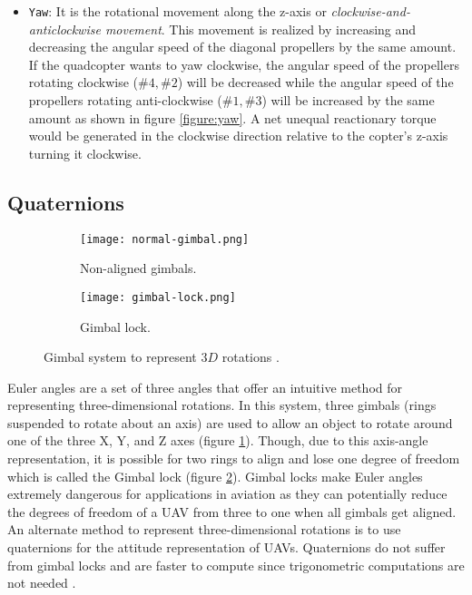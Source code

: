 \documentclass[10pt, a4paper]{article}
\newcommand{\code}[1]{\texttt{#1}}
\begin{document}
\begin{itemize}
        \item \code{Yaw}: It is the rotational movement along the z-axis or \textit{clockwise-and-anticlockwise movement}. This movement is realized by increasing and decreasing the angular speed of the diagonal propellers by the same amount. If the quadcopter wants to yaw clockwise, the angular speed of the propellers rotating clockwise ($\#4, \#2$) will be decreased while the angular speed of the propellers rotating anti-clockwise ($\#1, \#3$) will be increased by the same amount as shown in figure \ref{figure:yaw}. A net unequal reactionary torque would be generated in the clockwise direction relative to the copter's z-axis turning it clockwise.
    \end{itemize}

    \subsection{Quaternions}
    \label{section:quaternions}

    \begin{figure}[hbt!]
        \centering
        \begin{subfigure}[b]{0.35\textwidth}
            \centering
            \texttt{[image: normal-gimbal.png]}
            \caption{Non-aligned gimbals.}
            \label{figure:normal-gimbal}
        \end{subfigure}
        \begin{subfigure}[b]{0.35\textwidth}
            \centering
            \texttt{[image: gimbal-lock.png]}
            \caption{Gimbal lock.}
            \label{figure:gimbal-lock}
        \end{subfigure}
        \hfill
        \caption{Gimbal system to represent $3D$ rotations \cite{image:gimbals}.}
        \label{figure:gimbals}
    \end{figure}

    Euler angles are a set of three angles that offer an intuitive method for representing three-dimensional rotations. In this system, three gimbals (rings suspended to rotate about an axis) are used to allow an object to rotate around one of the three X, Y, and Z axes (figure \ref{figure:normal-gimbal}). Though, due to this axis-angle representation, it is possible for two rings to align and lose one degree of freedom which is called the Gimbal lock (figure \ref{figure:gimbal-lock}). Gimbal locks make Euler angles extremely dangerous for applications in aviation as they can potentially reduce the degrees of freedom of a UAV from three to one when all gimbals get aligned. An alternate method to represent three-dimensional rotations is to use quaternions for the attitude representation of UAVs. Quaternions do not suffer from gimbal locks and are faster to compute since trigonometric computations are not needed \cite{article:quadrocopter_quaternions}.
\end{document}
